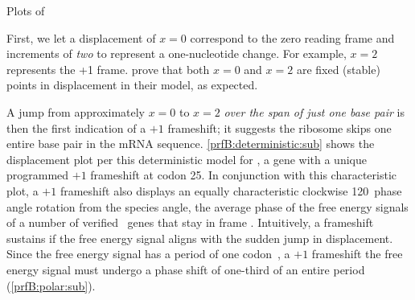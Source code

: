 \documentclass[12pt]{article}
\numberwithin{equation}{section}
\begin{document}
\begin{cfigure}
  \caption{Plots of~\prfB}
  \label{prfB:detplots}
\end{cfigure}

First, we let a displacement of $x = 0$ correspond to the zero reading
frame and increments of \emph{two} to represent a one-nucleotide
change. For example, $x =2$ represents the +1 frame.
\citet{lalit:embs} prove that both $x = 0$ and $x = 2$ are fixed
(stable) points in displacement in their model, as expected.

A jump from approximately $x = 0$ to $x = 2$ {\emph{over the span of just one base pair}} is then the first
indication of a $+1$ frameshift; it suggests the ribosome skips one
entire base pair in the mRNA sequence.  \autoref{prfB:deterministic:sub}
shows the displacement plot per this deterministic model for \prfB, a
gene with a unique programmed $+1$ frameshift at codon 25. In
conjunction with this characteristic plot, a $+1$ frameshift also
displays an equally characteristic clockwise 120\degree\ phase angle
rotation from the species angle, the average phase of the free energy
signals of a number of verified \ecoli\ genes that stay in frame \cite{lalit:mechanics}.  Intuitively, a
frameshift sustains if the free energy signal aligns with the sudden
jump in displacement.  Since the free energy signal has a period of
one codon~\cite{lalit:mechanics}, a $+1$ frameshift the free energy
signal must undergo a phase shift of one-third of an entire period
(\autoref{prfB:polar:sub}).
\end{document}
